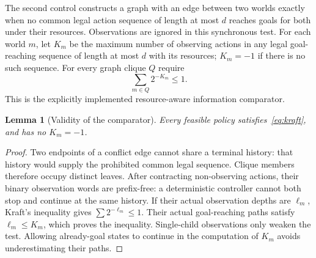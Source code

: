 \documentclass[11pt]{article}
\newtheorem{lemma}[theorem]{Lemma}
\theoremstyle{definition}
\begin{document}
The second control constructs a graph with an edge between two worlds exactly
when no common legal action sequence of length at most $d$ reaches goals for
both under their resources. Observations are ignored in this synchronous test.
For each world $m$, let $K_m$ be the maximum number of observing actions in any
legal goal-reaching sequence of length at most $d$ with its resources; $K_m=-1$
if there is no such sequence. For every graph clique $Q$ require
\begin{equation}\label{eq:kraft}
\sum_{m\in Q}2^{-K_m}\leq1.
\end{equation}
This is the explicitly implemented resource-aware information comparator.

\begin{lemma}[Validity of the comparator]
Every feasible policy satisfies~\eqref{eq:kraft}, and has no $K_m=-1$.
\end{lemma}
\begin{proof}
Two endpoints of a conflict edge cannot share a terminal history: that history
would supply the prohibited common legal sequence. Clique members therefore
occupy distinct leaves. After contracting non-observing actions, their binary
observation words are prefix-free: a deterministic controller cannot both stop
and continue at the same history. If their actual observation depths are
$\ell_m$, Kraft's inequality gives $\sum 2^{-\ell_m}\leq1$. Their actual
goal-reaching paths satisfy $\ell_m\leq K_m$, which proves the inequality.
Single-child observations only weaken the test. Allowing already-goal states
to continue in the computation of $K_m$ avoids underestimating their paths.
\end{proof}
\end{document}

